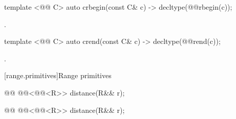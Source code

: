 %
\begin{itemdecl}
template <@@ C> auto crbegin(const C& c) -> decltype(@@rbegin(c));
\end{itemdecl}
\begin{itemdescr}
\pnum \returns {}.
\end{itemdescr}

%
\begin{itemdecl}
template <@@ C> auto crend(const C& c) -> decltype(@@rend(c));
\end{itemdecl}
\begin{itemdescr}
\pnum \returns {}.
\end{itemdescr}

{\color{newclr}
[range.primitives]{Range primitives}

%
\begin{itemdecl}
@@
@@<@@<R>> distance(R&& r);
\end{itemdecl}

\begin{itemdescr}
\pnum \returns {}
\end{itemdescr}

%
\begin{itemdecl}
@@
@@<@@<R>> distance(R&& r);
\end{itemdecl}

\begin{itemdescr}
\pnum \returns {}
\end{itemdescr}
}
